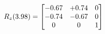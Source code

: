 \documentclass[preview]{standalone}
\begin{document}
\begin{align*}
\special{dvisvgm:raw <g id='unique000'>}R_{z}(3.98) = \begin{bmatrix}-0.67 & +0.74 & 0 \\-0.74 & -0.67 & 0 \\0 & 0 & 1\end{bmatrix}\special{dvisvgm:raw </g>}
\end{align*}
\end{document}
